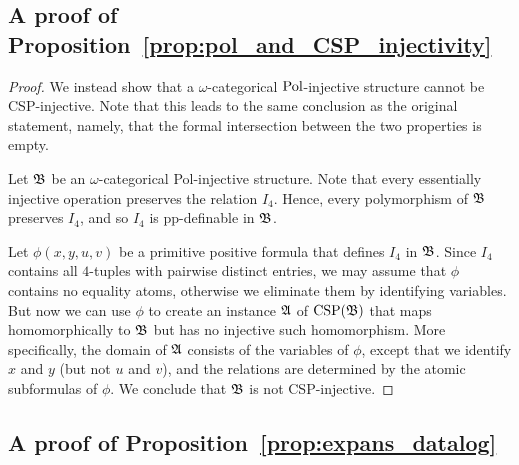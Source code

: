 \subsection{A proof of Proposition~\ref{prop:pol_and_CSP_injectivity}}
 

\clash*

\begin{proof}
We instead show that a $\omega$-categorical $\mathrm{Pol}$-injective structure cannot be CSP-injective. Note that this leads to the same conclusion as the original statement, namely, that the formal intersection between the two properties is empty.

    Let $\mathfrak{B}$ be an $\omega$-categorical Pol-injective structure. 
    Note that every essentially injective operation preserves the relation $I_4$.
    Hence, every polymorphism of $\mathfrak{B}$ preserves $I_4$, and so $I_4$ is pp-definable in $\mathfrak{B}$.
  
    
    Let $\phi(x,y,u,v)$ be a primitive positive formula that defines $I_4$ in $\mathfrak{B}$.
    Since $I_4$ contains all $4$-tuples with pairwise distinct entries, we may assume that $\phi$ contains no equality atoms, otherwise we eliminate them by identifying variables.
    But now we can use $\phi$ to create an instance $\mathfrak{A}$ of $\mathrm{CSP}(\mathfrak{B})$ that maps homomorphically to $\mathfrak{B}$ but has no injective such homomorphism.
    More specifically, the domain of $\mathfrak{A}$ consists of the variables of $\phi$, except that we identify $x$ and $y$ (but not $u$ and $v$), and the relations are determined by the atomic subformulas of $\phi$. We conclude that $\mathfrak{B}$ is not CSP-injective.   
\end{proof} 


\subsection{A proof of Proposition~\ref{prop:expans_datalog}}

\expansCSPinjective*
 
